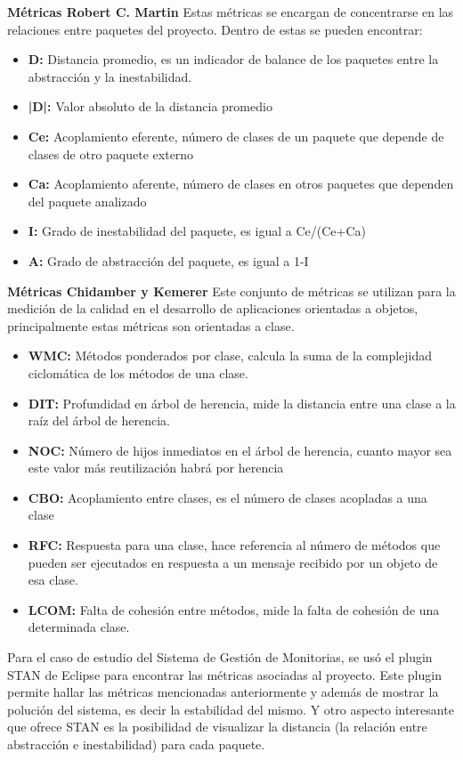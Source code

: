 \textbf{Métricas Robert C. Martin}
Estas métricas se encargan de concentrarse en las relaciones entre paquetes del proyecto. Dentro de estas se pueden encontrar:
\begin{itemize}[itemsep=0mm,topsep=0pt,leftmargin=0.6in]
	\item\textbf{D:} Distancia promedio, es un indicador de balance de los paquetes entre la abstracción y la inestabilidad.
	\item\textbf{|D|:} Valor absoluto de la distancia promedio
	\item\textbf{Ce:} Acoplamiento eferente, número de clases de un paquete que depende de clases de otro paquete externo
	\item\textbf{Ca:} Acoplamiento aferente, número de clases en otros paquetes que dependen del paquete analizado
	\item\textbf{I:} Grado de inestabilidad del paquete, es igual a Ce/(Ce+Ca)
	\item\textbf{A:} Grado de abstracción del paquete, es igual a 1-I
\end{itemize}

\textbf{Métricas Chidamber y Kemerer}
Este conjunto de métricas se utilizan para la medición de la calidad en el desarrollo de aplicaciones orientadas a objetos, principalmente estas métricas son orientadas a clase.
\begin{itemize}[itemsep=0mm,topsep=0pt,leftmargin=0.6in]
	\item\textbf{WMC:} Métodos ponderados por clase, calcula la suma de la complejidad ciclomática de los métodos de una clase.
	\item\textbf{DIT:} Profundidad en árbol de herencia, mide la distancia entre una clase a la raíz del árbol de herencia.
	\item\textbf{NOC:} Número de hijos inmediatos en el árbol de herencia, cuanto mayor sea este valor más reutilización habrá por herencia
	\item\textbf{CBO:} Acoplamiento entre clases, es el número de clases acopladas a una clase
	\item\textbf{RFC:} Respuesta para una clase, hace referencia al número de métodos que pueden ser ejecutados en respuesta a un mensaje recibido por un objeto de esa clase. 
	\item\textbf{LCOM:} Falta de cohesión entre métodos, mide la falta de cohesión de una determinada clase.
\end{itemize}

Para el caso de estudio del Sistema de Gestión de Monitorias, se usó el plugin STAN de Eclipse para encontrar las métricas asociadas al proyecto. Este plugin permite hallar las métricas mencionadas anteriormente y además de mostrar la polución del sistema, es decir la estabilidad del mismo. Y otro aspecto interesante que ofrece STAN es la posibilidad de visualizar la distancia (la relación entre abstracción e inestabilidad) para cada paquete.

